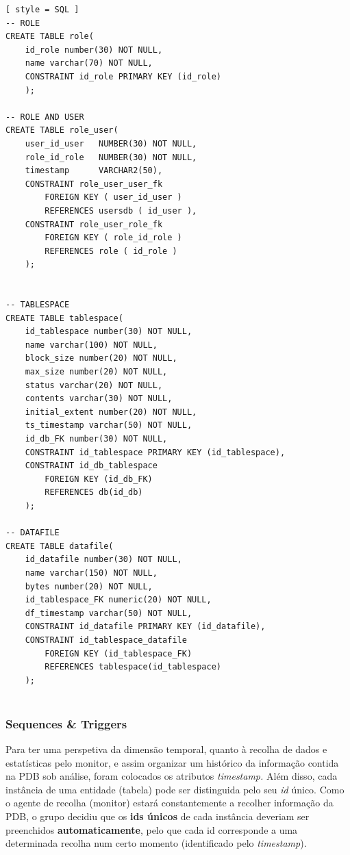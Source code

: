 \documentclass[a4paper]{article}
\begin{document}
\begin{lstlisting}[ style = SQL ]
-- ROLE
CREATE TABLE role(
    id_role number(30) NOT NULL,
    name varchar(70) NOT NULL,
    CONSTRAINT id_role PRIMARY KEY (id_role)
    );

-- ROLE AND USER
CREATE TABLE role_user(
    user_id_user   NUMBER(30) NOT NULL,
    role_id_role   NUMBER(30) NOT NULL,
    timestamp      VARCHAR2(50),
    CONSTRAINT role_user_user_fk 
        FOREIGN KEY ( user_id_user )
        REFERENCES usersdb ( id_user ),
    CONSTRAINT role_user_role_fk 
        FOREIGN KEY ( role_id_role )
        REFERENCES role ( id_role )
    );


-- TABLESPACE
CREATE TABLE tablespace(
    id_tablespace number(30) NOT NULL,
    name varchar(100) NOT NULL,
    block_size number(20) NOT NULL,
    max_size number(20) NOT NULL,
    status varchar(20) NOT NULL,
    contents varchar(30) NOT NULL,
    initial_extent number(20) NOT NULL,
    ts_timestamp varchar(50) NOT NULL,
    id_db_FK number(30) NOT NULL,
    CONSTRAINT id_tablespace PRIMARY KEY (id_tablespace),
    CONSTRAINT id_db_tablespace
        FOREIGN KEY (id_db_FK)
        REFERENCES db(id_db)
    );

-- DATAFILE
CREATE TABLE datafile(
    id_datafile number(30) NOT NULL,
    name varchar(150) NOT NULL,
    bytes number(20) NOT NULL,
    id_tablespace_FK numeric(20) NOT NULL,
    df_timestamp varchar(50) NOT NULL,
    CONSTRAINT id_datafile PRIMARY KEY (id_datafile),
    CONSTRAINT id_tablespace_datafile
        FOREIGN KEY (id_tablespace_FK)
        REFERENCES tablespace(id_tablespace)
    );
                    
\end{lstlisting}

\subsubsection{Sequences \& Triggers}
\hspace{3mm}

Para ter uma perspetiva da dimensão temporal, quanto à recolha de dados e estatísticas pelo monitor, e assim organizar um histórico da informação contida na PDB sob análise, foram colocados os atributos \emph{timestamp.} Além disso, cada instância de uma entidade (tabela) pode ser distinguida pelo seu \emph{id} único. Como o agente de recolha (monitor) estará constantemente a recolher informação da PDB, o grupo decidiu que os \textbf{ids únicos} de cada instância deveriam ser preenchidos \textbf{automaticamente}, pelo que cada id corresponde a uma determinada recolha num certo momento (identificado pelo \emph{timestamp}).
\end{document}
